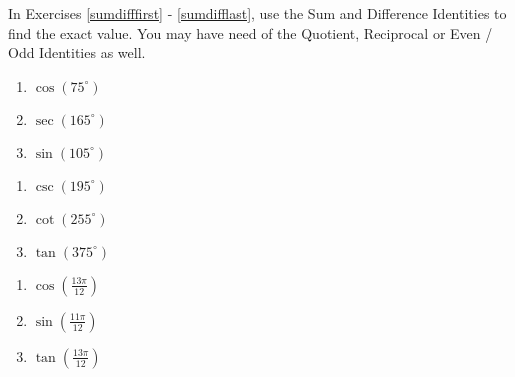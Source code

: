 \documentclass{ximera}
\begin{document}
In Exercises \ref{sumdifffirst} - \ref{sumdifflast}, use the Sum and Difference Identities to find the exact value.  You may have need of the Quotient, Reciprocal or Even / Odd Identities as well.

\begin{multicols}{3}

\begin{enumerate}

\setcounter{enumi}{\value{HW}}

\item  \label{cos75} $\cos(75^{\circ})$ \label{sumdifffirst} 
\item  $\sec(165^{\circ})$
\item  \label{sin105} $\sin(105^{\circ})$

\setcounter{HW}{\value{enumi}}

\end{enumerate}

\end{multicols}

\begin{multicols}{3}

\begin{enumerate}

\setcounter{enumi}{\value{HW}}

\item  $\csc(195^{\circ})$
\item  $\cot(255^{\circ})$
\item  $\tan(375^{\circ})$

\setcounter{HW}{\value{enumi}}

\end{enumerate}

\end{multicols}

\begin{multicols}{3}

\begin{enumerate}

\setcounter{enumi}{\value{HW}}

\item  $\cos\left(\frac{13\pi}{12}\right)$
\item  $\sin\left(\frac{11\pi}{12}\right)$
\item  $\tan\left(\frac{13\pi}{12}\right)$

\setcounter{HW}{\value{enumi}}

\end{enumerate}

\end{multicols}
\end{document}

